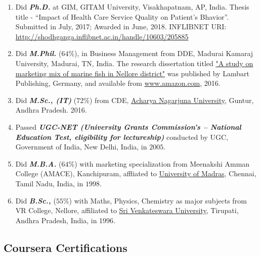 \documentclass[10pt]{article}
\begin{document}
\begin{enumerate} 

\item Did \emph{\textbf{Ph.D.}} at GIM, GITAM University, Visakhapatnam, AP, India. Thesis title - \enquote{Impact of Health Care Service Quality on Patient's Bhavior}. Submitted in July, 2017; Awarded in June, 2018. INFLIBNET URI: \url{http://shodhganga.inflibnet.ac.in/handle/10603/205885}

\item Did \textit{\textbf{M.Phil.}} ($64\%$), in Business Management from DDE, Madurai Kamaraj University, Madurai, TN, India. The research dissertation titled \href{http://www.amazon.in/Study-Marketing-Marine-Nellore-District/dp/3659259721}{"A study on marketing mix of marine fish in Nellore district"} was published by Lambart Publishing, Germany, and available from \url{www.amazon.com}, 2016. 

\item Did \textit{\textbf{M.Sc., (IT)}} ($72\%$) from CDE, \href{http://www.nagarjunauniversity.ac.in/}{Acharya Nagarjuna University}, Guntur, Andhra Pradesh. 2016. 

\item Passed \textit{\textbf{UGC-NET (University Grants Commission's – National Education Test, eligibility for lectureship)}} conducted by UGC, Government of India, New Delhi, India, in $2005$. 

\item Did \textit{\textbf{M.B.A.}} ($64\%$) with marketing specialization from Meenakshi Amman College (AMACE), Kanchipuram, affliated to \href{http://www.unom.ac.in/}{University of Madras}, Chennai, Tamil Nadu, India, in $1998$. 

\item Did \textit{\textbf{B.Sc.,}} ($55\%$) with Maths, Physics, Chemistry as major subjects from VR College, Nellore, affiliated to \href{http://svuniversity.ac.in/}{Sri Venkateswara University}, Tirupati, Andhra Pradesh, India, in 1996. \end{enumerate} 

\subsection{Coursera Certifications}
\end{document}
